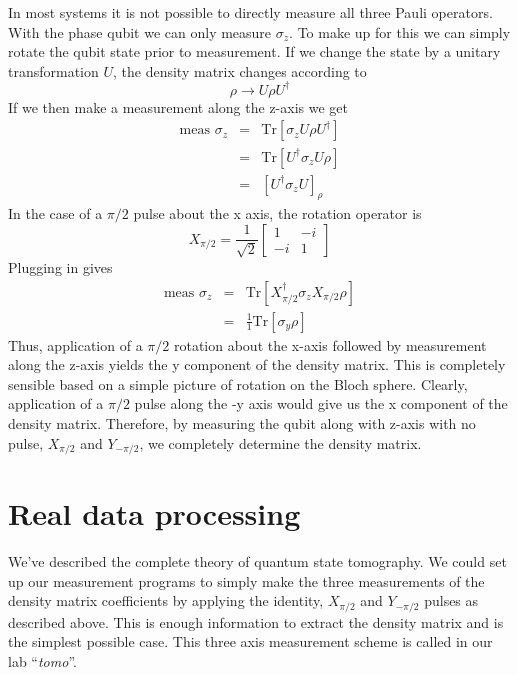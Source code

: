 \documentclass[twocolumn,english,aps,prl]{revtex4}
\begin{document}
In most systems it is not possible to directly measure all three Pauli operators. With the phase qubit we can only measure $\sigma_z$. To make up for this we can simply rotate the qubit state prior to measurement. If we change the state by a unitary transformation $U$, the density matrix changes according to \begin{equation}
\rho \rightarrow U \rho U^{\dagger} \end{equation}
If we then make a measurement along the z-axis we get \begin{eqnarray}
\textrm{meas }\sigma_z &=& \textrm{Tr} \left[ \sigma_z U \rho U^{\dagger} \right] \\
&=& \textrm{Tr} \left[ U^{\dagger} \sigma_z U \rho \right] \\
&=& \left[ U^{\dagger}\sigma_z U \right]_{\rho} \end{eqnarray}
In the case of a $\pi/2$ pulse about the x axis, the rotation operator is \begin{equation}
X_{\pi/2} = \frac{1}{\sqrt{2}} \left[ \begin{array}{cc} 1 & -i \\ -i & 1\end{array} \right] \end{equation}
Plugging in gives \begin{eqnarray}
\textrm{meas } \sigma_z &=& \textrm{Tr}\left[ X_{\pi/2}^{\dagger} \sigma_z X_{\pi/2} \rho \right] \\
&=& \frac{1}{1} \textrm{Tr}\left[ \sigma_y \rho \right] \end{eqnarray}
Thus, application of a $\pi/2$ rotation about the x-axis followed by measurement along the z-axis yields the y component of the density matrix. This is completely sensible based on a simple picture of rotation on the Bloch sphere. Clearly, application of a $\pi/2$ pulse along the -y axis would give us the x component of the density matrix. Therefore, by measuring the qubit along with z-axis with no pulse, $X_{\pi/2}$ and $Y_{-\pi/2}$, we completely determine the density matrix.

\section{Real data processing}

We've described the complete theory of quantum state tomography. We could set up our measurement programs to simply make the three measurements of the density matrix coefficients by applying the identity, $X_{\pi/2}$ and $Y_{-\pi/2}$ pulses as described above. This is enough information to extract the density matrix and is the simplest possible case. This three axis measurement scheme is called in our lab ``\emph{tomo}''.
\end{document}
